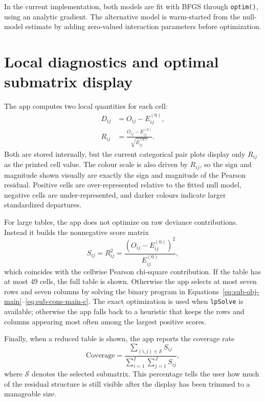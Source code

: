 \documentclass[preprint,12pt,a4paper]{elsarticle}
\numberwithin{equation}{section}
\begin{document}
In the current implementation, both models are fit with BFGS through \texttt{optim()}, using an analytic gradient. The alternative model is warm-started from the null-model estimate by adding zero-valued interaction parameters before optimization.

\section{Local diagnostics and optimal submatrix display}

The app computes two local quantities for each cell:
\begin{align}
D_{ij} &= O_{ij}-E^{(0)}_{ij},
\label{eq:app-dij}
\\
R_{ij} &= \frac{O_{ij}-E^{(0)}_{ij}}{\sqrt{E^{(0)}_{ij}}}.
\label{eq:app-rij}
\end{align}
Both are stored internally, but the current categorical pair plots display only $R_{ij}$ as the printed cell value. The colour scale is also driven by $R_{ij}$, so the sign and magnitude shown visually are exactly the sign and magnitude of the Pearson residual. Positive cells are over-represented relative to the fitted null model, negative cells are under-represented, and darker colours indicate larger standardized departures.

For large tables, the app does not optimize on raw deviance contributions. Instead it builds the nonnegative score matrix
\begin{equation}
S_{ij}=R_{ij}^2=\frac{\left(O_{ij}-E^{(0)}_{ij}\right)^2}{E^{(0)}_{ij}},
\label{eq:app-score}
\end{equation}
which coincides with the cellwise Pearson chi-square contribution. If the table has at most $49$ cells, the full table is shown. Otherwise the app selects at most seven rows and seven columns by solving the binary program in Equations~\eqref{eq:sub-obj-main}--\eqref{eq:sub-cons-main-c}. The exact optimization is used when \texttt{lpSolve} is available; otherwise the app falls back to a heuristic that keeps the rows and columns appearing most often among the largest positive scores.

Finally, when a reduced table is shown, the app reports the coverage rate
\begin{equation}
\mathrm{Coverage}=
\frac{\sum_{(i,j)\in\mathcal{S}} S_{ij}}
{\sum_{i=1}^{I}\sum_{j=1}^{J} S_{ij}},
\label{eq:app-coverage}
\end{equation}
where $\mathcal{S}$ denotes the selected submatrix. This percentage tells the user how much of the residual structure is still visible after the display has been trimmed to a manageable size.
\end{document}
